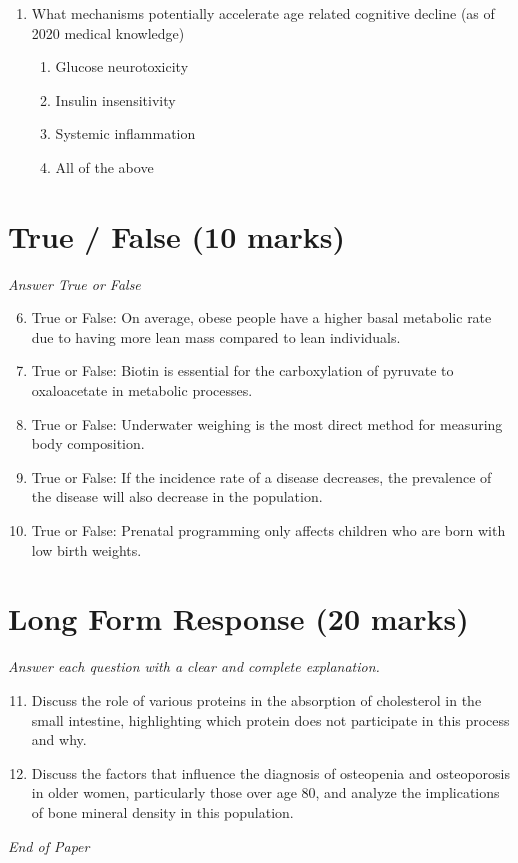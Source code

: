 \documentclass[12pt]{article}
\begin{document}
\begin{enumerate}[label=\arabic*.]
\begin{enumerate}[label=(\alph*)]
    \item Selenocysteine
    \item Selenohistidine
    \item Selenate
\end{enumerate}
\item What mechanisms potentially accelerate age related cognitive decline (as of 2020 medical knowledge)
\begin{enumerate}[label=(\alph*)]
    \item Glucose neurotoxicity
    \item Insulin insensitivity
    \item Systemic inflammation
    \item All of the above
\end{enumerate}
\end{enumerate}

\section*{True / False (10 marks)}
\textit{Answer True or False}
\begin{enumerate}[label=\arabic*.]
\setcounter{enumi}{5}
\item True or False: On average, obese people have a higher basal metabolic rate due to having more lean mass compared to lean individuals.
\item True or False: Biotin is essential for the carboxylation of pyruvate to oxaloacetate in metabolic processes.
\item True or False: Underwater weighing is the most direct method for measuring body composition.
\item True or False: If the incidence rate of a disease decreases, the prevalence of the disease will also decrease in the population.
\item True or False: Prenatal programming only affects children who are born with low birth weights.
\end{enumerate}

\section*{Long Form Response (20 marks)}
\textit{Answer each question with a clear and complete explanation.}
\begin{enumerate}[label=\arabic*.]
\setcounter{enumi}{10}
\item Discuss the role of various proteins in the absorption of cholesterol in the small intestine, highlighting which protein does not participate in this process and why.
\item Discuss the factors that influence the diagnosis of osteopenia and osteoporosis in older women, particularly those over age 80, and analyze the implications of bone mineral density in this population.
\end{enumerate}

\vfill
\noindent\textit{End of Paper}
\end{document}
